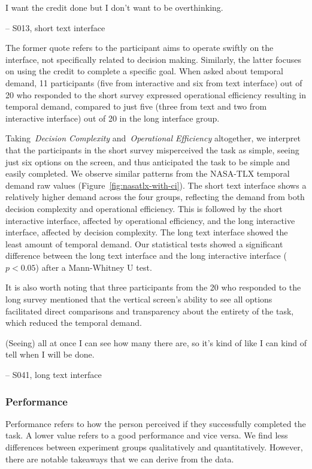 \begin{displayquote}
I want the credit done but I don't want to be overthinking.
            
\noindent \hfill -- S013, short text interface
\end{displayquote}

The former quote refers to the participant aims to operate swiftly on the interface, not specifically related to decision making. Similarly, the latter focuses on using the credit to complete a specific goal. When asked about temporal demand, 11 participants (five from interactive and six from text interface) out of 20 who responded to the short survey expressed operational efficiency resulting in temporal demand, compared to just five (three from text and two from interactive interface) out of 20 in the long interface group.

Taking~\textit{Decision Complexity} and~\textit{Operational Efficiency} altogether, we interpret that the participants in the short survey misperceived the task as simple, seeing just six options on the screen, and thus anticipated the task to be simple and easily completed. We observe similar patterns from the NASA-TLX temporal demand raw values (Figure~\ref{fig:nasatlx-with-ci}). The short text interface shows a relatively higher demand across the four groups, reflecting the demand from both decision complexity and operational efficiency. This is followed by the short interactive interface, affected by operational efficiency, and the long interactive interface, affected by decision complexity. The long text interface showed the least amount of temporal demand. Our statistical tests showed a significant difference between the long text interface and the long interactive interface ($p<0.05$) after a Mann-Whitney U test.

It is also worth noting that three participants from the 20 who responded to the long survey mentioned that the vertical screen's ability to see all options facilitated direct comparisons and transparency about the entirety of the task, which reduced the temporal demand.

\begin{displayquote}
(Seeing) all at once I can see how many there are, so it's kind of like I can kind of tell when I will be done.

\noindent \hfill -- S041, long text interface
\end{displayquote}

\subsubsection{Performance}
Performance refers to how the person perceived if they successfully completed the task. A lower value refers to a good performance and vice versa. We find less differences between experiment groups qualitatively and quantitatively. However, there are notable takeaways that we can derive from the data.

